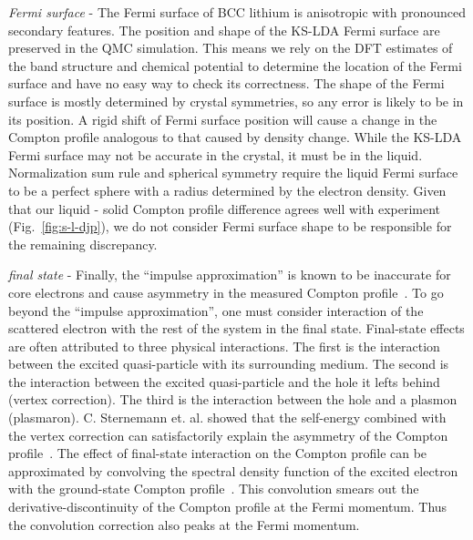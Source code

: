 \documentclass[aps,prb,showpacs,preprintnumbers,amsmath,amssymb,superscriptaddress,twocolumn]{revtex4-1}
\begin{document}
\emph{Fermi surface} - The Fermi surface of BCC lithium is anisotropic with pronounced secondary features. %
The position and shape of the KS-LDA Fermi surface are preserved in the QMC simulation. This means we rely on the DFT estimates of the band structure and chemical potential to determine the location of the Fermi surface and have no easy way to check its correctness.
The shape of the Fermi surface is mostly determined by crystal symmetries, so any error is likely to be in its position. A rigid shift of Fermi surface position will cause a change in the Compton profile analogous to that caused by density change.
While the KS-LDA Fermi surface may not be accurate in the crystal, it must be in the liquid. Normalization sum rule and spherical symmetry require the liquid Fermi surface to be a perfect sphere with a radius determined by the electron density.
Given that our liquid - solid Compton profile difference agrees well with experiment (Fig.~\ref{fig:s-l-djp}), we do not consider Fermi surface shape to be responsible for the remaining discrepancy.

\emph{final state} - Finally, the ``impulse approximation'' is known to be inaccurate for core electrons and cause asymmetry in the measured Compton profile~\cite{Eisenberger1970,Sternemann2000,Huotari2001}. To go beyond the ``impulse approximation'', one must consider interaction of the scattered electron with the rest of the system in the final state. Final-state effects are often attributed to three physical interactions. The first is the interaction between the excited quasi-particle with its surrounding medium. The second is the interaction between the excited quasi-particle and the hole it lefts behind (vertex correction). The third is the interaction between the hole and a plasmon (plasmaron). C. Sternemann et. al. showed that the self-energy combined with the vertex correction can satisfactorily explain the asymmetry of the Compton profile~\cite{Sternemann2000}. The effect of final-state interaction on the Compton profile can be approximated by convolving the spectral density function of the excited electron with the ground-state Compton profile~\cite{Soininen2001}. This convolution smears out the derivative-discontinuity of the Compton profile at the Fermi momentum. Thus the convolution correction also peaks at the Fermi momentum.
\end{document}
